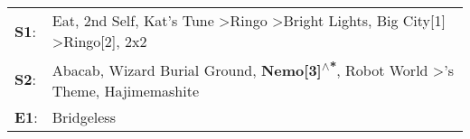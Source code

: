 \begin{supertabular}{p{0.03\textwidth}p{0.92\textwidth}}
 \textbf{S1}:  &  Eat\textsuperscript{}, \enspace 2nd Self\textsuperscript{}, \enspace Kat's Tune\textsuperscript{} \textgreater \enspace Ringo\textsuperscript{} \textgreater \enspace Bright Lights, Big City[1]\textsuperscript{} \textgreater \enspace Ringo[2]\textsuperscript{}, \enspace 2x2\textsuperscript{}  \enspace  \\
 \textbf{S2}:  &                                 Abacab\textsuperscript{}, \enspace Wizard Burial Ground\textsuperscript{}, \enspace \textbf{Nemo[3]\textsuperscript{$\wedge$*}}, \enspace Robot World\textsuperscript{} \textgreater {}'s Theme\textsuperscript{}, \enspace Hajimemashite\textsuperscript{}  \enspace  \\
 \textbf{E1}:  &                                                                                                                                                                                                                                                                         Bridgeless\textsuperscript{}  \enspace  \\
\end{supertabular}
